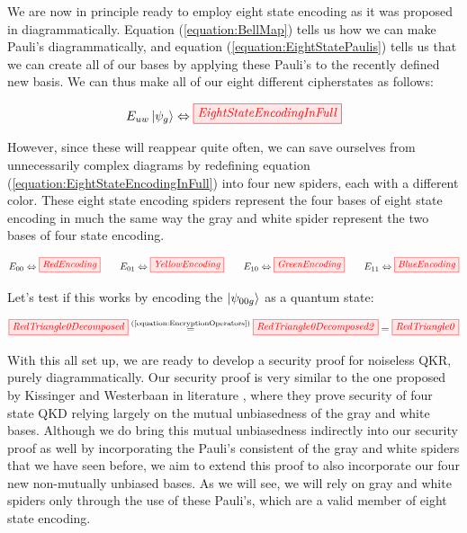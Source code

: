 \documentclass[]{article}
\newcommand{\equaltext}[1]{\ensuremath{\stackrel{\text{#1}}{=}}}
\begin{document}
We are now in principle ready to employ eight state encoding as it was proposed in \cite{DeVries2016} diagrammatically. Equation (\ref{equation:BellMap}) tells us how we can make Pauli's diagrammatically, and equation (\ref{equation:EightStatePaulis}) tells us that we can create all of our bases by applying these Pauli's to the recently defined new basis. We can thus make all of our eight different cipherstates as follows:

\begin{equation}
	\label{equation:EightStateEncodingInFull}
	E_{uw}\ket{\psi_{g}} \Leftrightarrow\tikzfig{EightStateEncodingInFull}
\end{equation}

However, since these will reappear quite often, we can save ourselves from unnecessarily complex diagrams by redefining equation (\ref{equation:EightStateEncodingInFull}) into four new spiders, each with a different color. These eight state encoding spiders represent the four bases of eight state encoding in much the same way the gray and white spider represent the two bases of four state encoding. 

\begin{equation}
	\label{equation:EncryptionOperators}
	E_{00} \Leftrightarrow \tikzfig{RedEncoding} ~~~~~~ E_{01} \Leftrightarrow \tikzfig{YellowEncoding}~~~~~~ E_{10} \Leftrightarrow \tikzfig{GreenEncoding}~~~~~~ E_{11} \Leftrightarrow \tikzfig{BlueEncoding}
\end{equation}

Let's test if this works by encoding the $\ket{\psi_{00g}}$ as a quantum state:

\begin{equation}
	\label{equation:RedTriangleDecomposed}
	\tikzfig{RedTriangle0Decomposed} \equaltext{(\ref{equation:EncryptionOperators})} \tikzfig{RedTriangle0Decomposed2} =
	\tikzfig{RedTriangle0}
\end{equation}

With this all set up, we are ready to develop a security proof for noiseless QKR, purely diagrammatically. Our security proof is very similar to the one proposed by Kissinger and Westerbaan in literature \cite{Kissinger2017}, where they prove security of four state QKD relying largely on the mutual unbiasedness of the gray and white bases. Although we do bring this mutual unbiasedness indirectly into our security proof as well by incorporating the Pauli's consistent of the gray and white spiders that we have seen before, we aim to extend this proof to also incorporate our four new non-mutually unbiased bases. As we will see, we will rely on gray and white spiders only through the use of these Pauli's, which are a valid member of eight state encoding.
\end{document}
